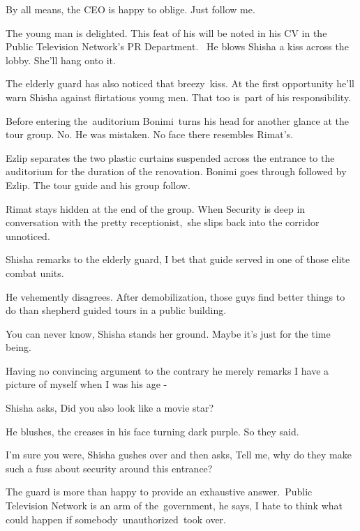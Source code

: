 \documentclass[letterpaper]{article}
\begin{document}
{\textquotedbl}By all means,{\textquotedbl} the CEO is happy to oblige. {\textquotedbl}Just follow me.{\textquotedbl}

The young man is delighted. This feat of his will be noted in his CV in the Public Television Network's PR Department.
~He blows Shisha a kiss across the lobby. She'll hang onto it.

The elderly guard has also noticed that breezy\ kiss. \MakeUppercase{A}t the first opportunity he'll warn Shisha against
flirtatious young men. That too is~part of his responsibility.\ 

Before entering the\ auditorium Bonimi\ turns his head for another glance at the tour group. No. He was mistaken. No
face there resembles Rimat's. 

Ezlip separates the two plastic curtains suspended across the entrance to the auditorium for the duration of the
renovation. Bonimi goes through followed by Ezlip. The tour guide and his group follow. 

Rimat stays hidden at the end of the group. When Security is deep in conversation with the pretty receptionist,\ she
slips back into the corridor unnoticed.

Shisha remarks to the elderly guard, {\textquotedbl}I bet that guide served in one of those elite combat
units.{\textquotedbl}\ \ 

He vehemently disagrees. {\textquotedbl}After demobilization, those guys find better things to do than shepherd guided
tours in a public building.{\textquotedbl} 

{\textquotedbl}You can never know,{\textquotedbl} Shisha stands her ground. {\textquotedbl}Maybe it's just for the time
being.{\textquotedbl} 

Having no convincing argument to the contrary he merely remarks {\textquotedbl}I have a picture of myself when I was his
age -{\textquotedbl}\ \ 

Shisha asks, {\textquotedbl}Did you also look like a movie star?{\textquotedbl} 

He blushes, the creases in his face turning dark purple. {\textquotedbl}So they said.{\textquotedbl}~ 

{\textquotedbl}I'm sure you were,{\textquotedbl} Shisha gushes over and then asks, {\textquotedbl}Tell me, why do they
make such a fuss about security around this entrance?{\textquotedbl} 

The guard is more than happy to provide an exhaustive answer.\ {\textquotedbl}Public Television Network is an arm of
the~government,{\textquotedbl} he says, {\textquotedbl}I hate to think what could happen if somebody~unauthorized~took
over.{\textquotedbl}
\end{document}
